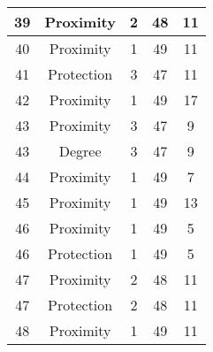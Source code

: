 \documentclass[results.tex]{subfiles}
\begin{document}
\begin{center}
\begin{tabular}{| c || c | c | c | c |}
            \hline
            39                      & Proximity                    & 2                      & 48                      & 11                   \\
            \hline
            40                      & Proximity                    & 1                      & 49                      & 11                   \\
            \hline
            41                      & Protection                   & 3                      & 47                      & 11                   \\
            \hline
            42                      & Proximity                    & 1                      & 49                      & 17                   \\
            \hline
            43                      & Proximity                    & 3                      & 47                      & 9                    \\
            \hline
            43                      & Degree                       & 3                      & 47                      & 9                    \\
            \hline
            44                      & Proximity                    & 1                      & 49                      & 7                    \\
            \hline
            45                      & Proximity                    & 1                      & 49                      & 13                   \\
            \hline
            46                      & Proximity                    & 1                      & 49                      & 5                    \\
            \hline
            46                      & Protection                   & 1                      & 49                      & 5                    \\
            \hline
            47                      & Proximity                    & 2                      & 48                      & 11                   \\
            \hline
            47                      & Protection                   & 2                      & 48                      & 11                   \\
            \hline
            48                      & Proximity                    & 1                      & 49                      & 11                   \\

\end{tabular}
\end{center}
\end{document}

